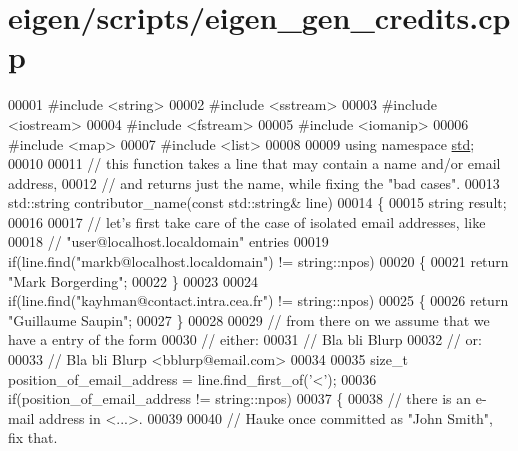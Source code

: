 \hypertarget{eigen_2scripts_2eigen__gen__credits_8cpp_source}{}\section{eigen/scripts/eigen\+\_\+gen\+\_\+credits.cpp}
\label{eigen_2scripts_2eigen__gen__credits_8cpp_source}

\begin{DoxyCode}
00001 \textcolor{preprocessor}{#include <string>}
00002 \textcolor{preprocessor}{#include <sstream>}
00003 \textcolor{preprocessor}{#include <iostream>}
00004 \textcolor{preprocessor}{#include <fstream>}
00005 \textcolor{preprocessor}{#include <iomanip>}
00006 \textcolor{preprocessor}{#include <map>}
00007 \textcolor{preprocessor}{#include <list>}
00008 
00009 \textcolor{keyword}{using namespace }\hyperlink{namespacestd}{std};
00010 
00011 \textcolor{comment}{// this function takes a line that may contain a name and/or email address,}
00012 \textcolor{comment}{// and returns just the name, while fixing the "bad cases".}
00013 std::string contributor\_name(\textcolor{keyword}{const} std::string& line)
00014 \{
00015   \textcolor{keywordtype}{string} result;
00016 
00017   \textcolor{comment}{// let's first take care of the case of isolated email addresses, like}
00018   \textcolor{comment}{// "user@localhost.localdomain" entries}
00019   \textcolor{keywordflow}{if}(line.find(\textcolor{stringliteral}{"markb@localhost.localdomain"}) != string::npos)
00020   \{
00021     \textcolor{keywordflow}{return} \textcolor{stringliteral}{"Mark Borgerding"};
00022   \}
00023 
00024   \textcolor{keywordflow}{if}(line.find(\textcolor{stringliteral}{"kayhman@contact.intra.cea.fr"}) != string::npos)
00025   \{
00026     \textcolor{keywordflow}{return} \textcolor{stringliteral}{"Guillaume Saupin"};
00027   \}
00028 
00029   \textcolor{comment}{// from there on we assume that we have a entry of the form}
00030   \textcolor{comment}{// either:}
00031   \textcolor{comment}{//   Bla bli Blurp}
00032   \textcolor{comment}{// or:}
00033   \textcolor{comment}{//   Bla bli Blurp <bblurp@email.com>}
00034   
00035   \textcolor{keywordtype}{size\_t} position\_of\_email\_address = line.find\_first\_of(\textcolor{charliteral}{'<'});
00036   \textcolor{keywordflow}{if}(position\_of\_email\_address != string::npos)
00037   \{
00038     \textcolor{comment}{// there is an e-mail address in <...>.}
00039     
00040     \textcolor{comment}{// Hauke once committed as "John Smith", fix that.}

\end{DoxyCode}
